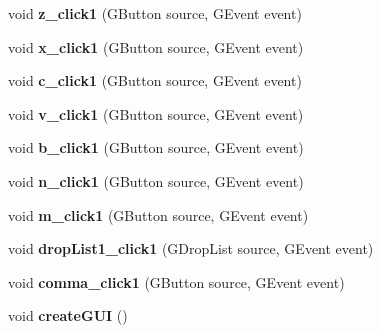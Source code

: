 \begin{DoxyCompactItemize}
\item 
\hypertarget{classkeyplayer_a5c90178dd9aec63580115fe819090500}{void {\bfseries z\+\_\+click1} (G\+Button source, G\+Event event)}\label{classkeyplayer_a5c90178dd9aec63580115fe819090500}

\item 
\hypertarget{classkeyplayer_aaa1dd6f6e14cb159510891509b32e75c}{void {\bfseries x\+\_\+click1} (G\+Button source, G\+Event event)}\label{classkeyplayer_aaa1dd6f6e14cb159510891509b32e75c}

\item 
\hypertarget{classkeyplayer_a7a48d806f3a128e77926322bf72b958d}{void {\bfseries c\+\_\+click1} (G\+Button source, G\+Event event)}\label{classkeyplayer_a7a48d806f3a128e77926322bf72b958d}

\item 
\hypertarget{classkeyplayer_ae7a62ee5fce7b79bc9336a4ee59229d6}{void {\bfseries v\+\_\+click1} (G\+Button source, G\+Event event)}\label{classkeyplayer_ae7a62ee5fce7b79bc9336a4ee59229d6}

\item 
\hypertarget{classkeyplayer_aa1ee94f5ef57dbbf9fab15bcf1cc3322}{void {\bfseries b\+\_\+click1} (G\+Button source, G\+Event event)}\label{classkeyplayer_aa1ee94f5ef57dbbf9fab15bcf1cc3322}

\item 
\hypertarget{classkeyplayer_a5a2dfbf19de127e8309f01c6a1697f80}{void {\bfseries n\+\_\+click1} (G\+Button source, G\+Event event)}\label{classkeyplayer_a5a2dfbf19de127e8309f01c6a1697f80}

\item 
\hypertarget{classkeyplayer_a8d70fc97fb9f9ac0c83040a006cb65cf}{void {\bfseries m\+\_\+click1} (G\+Button source, G\+Event event)}\label{classkeyplayer_a8d70fc97fb9f9ac0c83040a006cb65cf}

\item 
\hypertarget{classkeyplayer_a55d77ebad7ffd34187619fb6cd732f4c}{void {\bfseries drop\+List1\+\_\+click1} (G\+Drop\+List source, G\+Event event)}\label{classkeyplayer_a55d77ebad7ffd34187619fb6cd732f4c}

\item 
\hypertarget{classkeyplayer_a4ad43a875652d9e80bd48e54c0a9b8fe}{void {\bfseries comma\+\_\+click1} (G\+Button source, G\+Event event)}\label{classkeyplayer_a4ad43a875652d9e80bd48e54c0a9b8fe}

\item 
\hypertarget{classkeyplayer_aedef180177a9e5b77173626a0f5bda08}{void {\bfseries create\+G\+U\+I} ()}\label{classkeyplayer_aedef180177a9e5b77173626a0f5bda08}

\end{DoxyCompactItemize}
